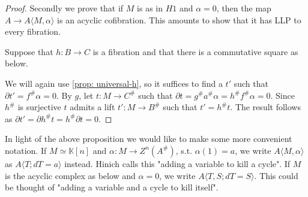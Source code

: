 \documentclass[../thesis.tex]{subfiles}
\begin{document}
\begin{proof}
                Secondly we prove that if $M$ is as in $H1$ and $\alpha = 0$, then the map $A \rightarrow A\langle M,\alpha\rangle$ is an acyclic cofibration. This amounts to show that it has LLP to every fibration.
                
                Suppose that $h: B \rightarrow C$ is a fibration and that there is a commutative square as below.
                \begin{center}
                \end{center}

                We will again use \ref{prop: universal-h}, so it suffices to find a $t'$ such that $\partial t' = f^\#\alpha = 0$. By $g$, let $t : M \rightarrow C^\#$ such that $\partial t = g^\#a^\#\alpha = h^\# f^\# \alpha = 0$. Since $h^\#$ is surjective $t$ admits a lift $t' : M \rightarrow B^\#$ such that $t' = h^\#t$. The result follows as $\partial t' = \partial h^\#t = h^\#\partial t = 0$.

            \end{proof}

            In light of the above proposition we would like to make some more convenient notation. If $M\simeq \mathbb{K}[n]$ and $\alpha: M \rightarrow Z^n(A^\#)$, s.t. $\alpha(1) = a$, we write $A\langle M,\alpha\rangle$ as $A\langle T; dT = a\rangle$ instead. Hinich calls this "adding a variable to kill a cycle". If $M$ is the acyclic complex as below and $\alpha = 0$, we write $A\langle T, S; dT = S\rangle$. This could be thought of "adding a variable and a cycle to kill itself".

            \begin{center}
            \end{center}
\end{document}
